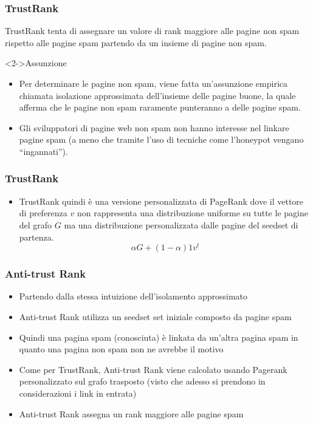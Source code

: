 \documentclass{beamer}
\begin{document}
\begin{frame}
  \frametitle{TrustRank}
  TrustRank tenta di assegnare un valore di rank maggiore alle pagine non spam rispetto alle pagine spam partendo da un insieme di pagine non spam.
  \begin{block}<2->{Assunzione}
  \begin{itemize}
   \item Per determinare le pagine non spam, viene fatta un’assunzione empirica chiamata isolazione approssimata dell’insieme delle pagine buone, la quale afferma che le pagine non spam raramente punteranno a delle pagine spam.
   \item Gli sviluppatori di pagine web non spam non hanno interesse nel linkare pagine spam (a meno che tramite l’uso di tecniche come l’honeypot vengano “ingannati”).
  \end{itemize}
  \end{block}
\end{frame}
\begin{frame}
  \frametitle{TrustRank}
  \begin{itemize}
   \item   TrustRank quindi è una versione personalizzata di PageRank dove il vettore di preferenza \(v\) non rappresenta una distribuzione uniforme su tutte le pagine del grafo \(G\) ma una distribuzione personalizzata dalle pagine del seedset di partenza.
$$
   \alpha G + (1-\alpha)1v^t
$$
  \end{itemize}
\end{frame}
\begin{frame}
  \frametitle{Anti-trust Rank}
  \begin{itemize}
   \item Partendo dalla stessa intuizione dell'isolamento approssimato 
   \item Anti-trust Rank utilizza un seedset set iniziale composto da pagine spam
   \item Quindi una pagina spam (conosciuta) è linkata da un'altra pagina spam in quanto una pagina non spam non ne avrebbe il motivo 
   \item Come per TrustRank, Anti-trust Rank viene calcolato usando Pagerank personalizzato sul grafo trasposto (visto che adesso si prendono in considerazioni i link in entrata)
   \item Anti-trust Rank assegna un rank maggiore alle pagine spam
  \end{itemize}
\end{frame}
\end{document}

